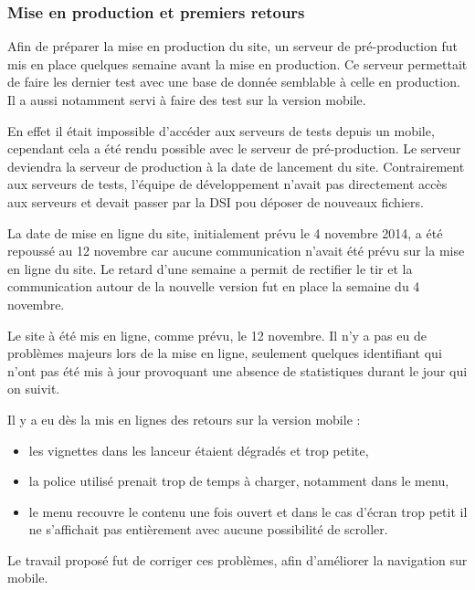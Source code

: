 \documentclass[12pt,a4paper]{article}
\begin{document}
\subsubsection{Mise en production et premiers retours}
Afin de préparer la mise en production du site, un serveur de pré-production fut mis en place quelques semaine avant la mise en production. Ce serveur permettait de faire les dernier test avec une base de donnée semblable à celle en production. Il a aussi notamment servi à faire des test sur la version mobile.\par 
En effet il était impossible d'accéder aux serveurs de tests depuis un mobile, cependant cela a été rendu possible avec le serveur de pré-production. Le serveur deviendra la serveur de production à la date de lancement du site. Contrairement aux serveurs de tests, l'équipe de développement n'avait pas directement accès aux serveurs et devait passer par la DSI pou déposer de nouveaux fichiers.\par 
\bigskip
La date de mise en ligne du site, initialement prévu le 4 novembre 2014, a été repoussé au 12 novembre car aucune communication n'avait été prévu sur la mise en ligne du site. Le retard d'une semaine a permit de rectifier le tir et la communication autour de la nouvelle version fut en place la semaine du 4 novembre.\par
Le site à été mis en ligne, comme prévu, le 12 novembre. Il n'y a pas eu de problèmes majeurs lors de la mise en ligne, seulement quelques identifiant qui n'ont pas été mis à jour provoquant une absence de statistiques durant le jour qui on suivit.\par 
Il y a eu dès la mis en lignes des retours sur la version mobile :
\begin{itemize}
\item les vignettes dans les lanceur étaient dégradés et trop petite,
\item la police utilisé prenait trop de temps à charger, notamment dans le menu,
\item le menu recouvre le contenu une fois ouvert et dans le cas d'écran trop petit il ne s'affichait pas entièrement avec aucune possibilité de scroller.
\end{itemize}
Le travail proposé fut de corriger ces problèmes, afin d'améliorer la navigation sur mobile.
\end{document}

